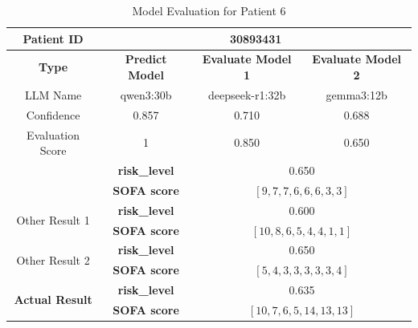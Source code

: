 \begin{table}[htbp]
 \centering
 \caption{Model Evaluation for Patient 6}
 \label{tab:patient6}
 \begin{tabular}{cccc}
 \toprule
 \textbf{ Patient ID } & \multicolumn{3}{c}{30893431} \\
 \midrule
 \textbf{ Type } & \textbf{ Predict Model } & \textbf{ Evaluate Model 1 } & \textbf{ Evaluate Model 2 } \\
 LLM Name & qwen3:30b & deepseek-r1:32b & gemma3:12b \\
 Confidence & 0.857 & 0.710 & 0.688 \\
 Evaluation Score & 1 & 0.850 & 0.650 \\
 \midrule
 \addlinespace
 \multirow{2}{*}{\textbf{ Best Result }} & \textbf{ risk\_level } & \multicolumn{2}{c}{0.650} \\
      & \textbf{ SOFA score } & \multicolumn{2}{c}{$[9, 7, 7, 6, 6, 6, 3, 3]$} \\
 \midrule
 \multirow{2}{*}{Other Result 1} & \textbf{ risk\_level } & \multicolumn{2}{c}{0.600} \\
      & \textbf{ SOFA score } & \multicolumn{2}{c}{$[10, 8, 6, 5, 4, 4, 1, 1]$} \\
 \midrule
 \multirow{2}{*}{Other Result 2} & \textbf{ risk\_level } & \multicolumn{2}{c}{0.650} \\
      & \textbf{ SOFA score } & \multicolumn{2}{c}{$[5, 4, 3, 3, 3, 3, 3, 4]$} \\
 \midrule
 \multirow{2}{*}{\textbf{ Actual Result }} & \textbf{ risk\_level } & \multicolumn{2}{c}{0.635} \\
      & \textbf{ SOFA score } & \multicolumn{2}{c}{$[10, 7, 6, 5, 14, 13, 13]$} \\
 \bottomrule
 \end{tabular}
\end{table}

